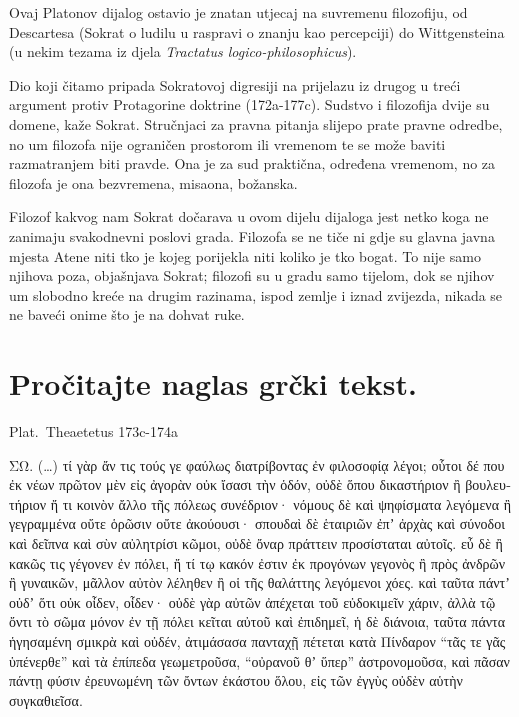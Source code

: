 Ovaj Platonov dijalog ostavio je znatan utjecaj na suvremenu filozofiju, od Descartesa (Sokrat o ludilu u raspravi o znanju kao percepciji) do Wittgensteina (u nekim tezama iz djela \textit{Tractatus logico-philosophicus}).

Dio koji čitamo pripada Sokratovoj digresiji na prijelazu iz drugog u treći argument protiv Protagorine doktrine (172a-177c). Sudstvo i filozofija dvije su domene, kaže Sokrat. Stručnjaci za pravna pitanja slijepo prate pravne odredbe, no um filozofa nije ograničen prostorom ili vremenom te se može baviti razmatranjem biti pravde. Ona je za sud praktična, određena vremenom, no za filozofa je ona bezvremena, misaona, božanska. 

Filozof kakvog nam Sokrat dočarava u ovom dijelu dijaloga jest netko koga ne zanimaju svakodnevni poslovi grada. Filozofa se ne tiče ni gdje su glavna javna mjesta Atene niti tko je kojeg porijekla niti koliko je tko bogat. To nije samo njihova poza, objašnjava Sokrat; filozofi su u gradu samo tijelom, dok se njihov um slobodno kreće na drugim razinama, ispod zemlje i iznad zvijezda, nikada se ne baveći onime što je na dohvat ruke.



\section*{Pročitajte naglas grčki tekst.}

Plat.\ Theaetetus 173c-174a


\medskip


{\large

\begin{greek}

\noindent ΣΩ. (\dots) τί γὰρ ἄν τις τούς γε φαύλως διατρίβοντας ἐν φιλοσοφίᾳ λέγοι; οὗτοι δέ που ἐκ νέων πρῶτον μὲν εἰς ἀγορὰν οὐκ ἴσασι τὴν ὁδόν, οὐδὲ ὅπου δικαστήριον ἢ βουλευτήριον ἤ τι κοινὸν ἄλλο τῆς πόλεως συνέδριον· νόμους δὲ καὶ ψηφίσματα λεγόμενα ἢ γεγραμμένα οὔτε ὁρῶσιν οὔτε ἀκούουσι· σπουδαὶ δὲ ἑταιριῶν ἐπʼ ἀρχὰς καὶ σύνοδοι καὶ δεῖπνα καὶ σὺν αὐλητρίσι κῶμοι, οὐδὲ ὄναρ πράττειν προσίσταται αὐτοῖς. εὖ δὲ ἢ κακῶς τις γέγονεν ἐν πόλει, ἤ τί τῳ κακόν ἐστιν ἐκ προγόνων γεγονὸς ἢ πρὸς ἀνδρῶν ἢ γυναικῶν, μᾶλλον αὐτὸν λέληθεν ἢ οἱ τῆς θαλάττης λεγόμενοι χόες. καὶ ταῦτα πάντʼ οὐδʼ ὅτι οὐκ οἶδεν, οἶδεν· οὐδὲ γὰρ αὐτῶν ἀπέχεται τοῦ εὐδοκιμεῖν χάριν, ἀλλὰ τῷ ὄντι τὸ σῶμα μόνον ἐν τῇ πόλει κεῖται αὐτοῦ καὶ ἐπιδημεῖ, ἡ δὲ διάνοια, ταῦτα πάντα ἡγησαμένη σμικρὰ καὶ οὐδέν, ἀτιμάσασα πανταχῇ πέτεται κατὰ Πίνδαρον ``τᾶς τε γᾶς ὑπένερθε'' καὶ τὰ ἐπίπεδα γεωμετροῦσα, ``οὐρανοῦ θʼ ὕπερ'' ἀστρονομοῦσα, καὶ πᾶσαν πάντῃ φύσιν ἐρευνωμένη τῶν ὄντων ἑκάστου ὅλου, εἰς τῶν ἐγγὺς οὐδὲν αὑτὴν συγκαθιεῖσα.

\end{greek}

}


